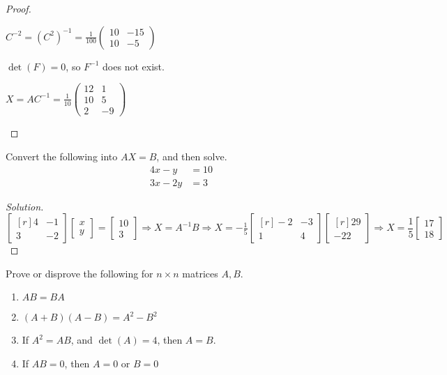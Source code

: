 \documentclass[crop=false,class=book,oneside]{standalone}
\begin{document}
\begin{proof}
\begin{enumerate}
\begin{multicols}{2}
        \item $C^{-2} = (C^2)^{-1} = \frac{1}{100}\begin{pmatrix}10 & -15 \\ 10 & -5\end{pmatrix}$
        \item $\det(F) = 0$, so $F^{-1}$ does not exist. 
        \item $X = AC^{-1} = \frac{1}{10}\begin{pmatrix}12 & 1\\10 & 5\\ 2 & -9\end{pmatrix}$
    \end{multicols}    
    \end{enumerate}
    \end{proof}
    \clearpage
    \begin{problem}
    Convert the following into $AX = B$, and then solve.
    \begin{align*}
        4x - y &= 10\\
        3x - 2y &= 3
    \end{align*}
    \end{problem}
    \begin{proof}[Solution]
    \vspace{-\topsep}
    \begin{equation*}
        \begin{bmatrix*}[r]4&-1\\3&-2\end{bmatrix*}\begin{bmatrix}x\\y\end{bmatrix}=\begin{bmatrix}10\\3\end{bmatrix}\Rightarrow X=A^{-1}B\Rightarrow X=-\tfrac{1}{5}\begin{bmatrix*}[r]-2&-3\\1&4\end{bmatrix*}\begin{bmatrix*}[r]29\\-22\end{bmatrix*}\Rightarrow X=\frac{1}{5}\begin{bmatrix}17\\18\end{bmatrix}
    \end{equation*}
    \end{proof}
    \begin{problem}
    Prove or disprove the following for $n\times n$ matrices $A, B$.
    \begin{enumerate}
        \item $AB = BA$
        \item $(A+B)(A-B) = A^2 - B^2$
        \item If $A^2 = AB$, and $\det(A) = 4$, then $A=B$.
        \item If $AB = 0$, then $A=0$ or $B=0$
    \end{enumerate}
    \end{problem}
\end{document}
